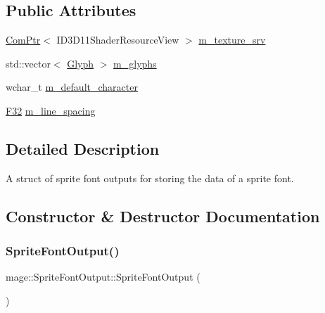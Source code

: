 \subsection*{Public Attributes}
\begin{DoxyCompactItemize}
\item 
\hyperlink{namespacemage_ae74f374780900893caa5555d1031fd79}{Com\+Ptr}$<$ I\+D3\+D11\+Shader\+Resource\+View $>$ \hyperlink{structmage_1_1_sprite_font_output_abece35d0abdacf81538969a3ec8a5617}{m\+\_\+texture\+\_\+srv}
\item 
std\+::vector$<$ \hyperlink{structmage_1_1_glyph}{Glyph} $>$ \hyperlink{structmage_1_1_sprite_font_output_a07fbd1b16f85a2dc1c6a45e54174709c}{m\+\_\+glyphs}
\item 
wchar\+\_\+t \hyperlink{structmage_1_1_sprite_font_output_a137cca7a8a91c623272b345e9931ca80}{m\+\_\+default\+\_\+character}
\item 
\hyperlink{namespacemage_aa97e833b45f06d60a0a9c4fc22ae02c0}{F32} \hyperlink{structmage_1_1_sprite_font_output_afa189d48c92167f6a01f63a1616b7c95}{m\+\_\+line\+\_\+spacing}
\end{DoxyCompactItemize}


\subsection{Detailed Description}
A struct of sprite font outputs for storing the data of a sprite font. 

\subsection{Constructor \& Destructor Documentation}
\hypertarget{structmage_1_1_sprite_font_output_a91ed0cd4cb7f9bfab57ff0e3fa4436bc}{}\label{structmage_1_1_sprite_font_output_a91ed0cd4cb7f9bfab57ff0e3fa4436bc} 
\subsubsection{\texorpdfstring{Sprite\+Font\+Output()}{SpriteFontOutput()}\hspace{0.1cm}{\footnotesize\ttfamily [1/3]}}
{\footnotesize\ttfamily mage\+::\+Sprite\+Font\+Output\+::\+Sprite\+Font\+Output (\begin{DoxyParamCaption}{ }\end{DoxyParamCaption})\hspace{0.3cm}{\ttfamily [default]}}

